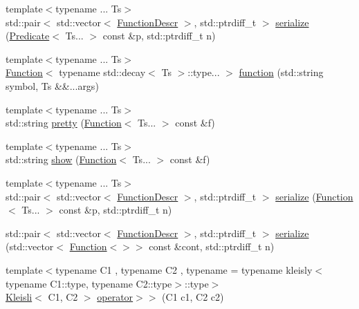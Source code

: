 \begin{DoxyCompactItemize}
\item 
{\footnotesize template$<$typename ... Ts$>$ }\\std\+::pair$<$ std\+::vector$<$ \hyperlink{structpfq_1_1lang_1_1FunctionDescr}{Function\+Descr} $>$, std\+::ptrdiff\+\_\+t $>$ \hyperlink{namespacepfq_1_1lang_ad631d8e32cf8613ad1f3f19f1b02cab6}{serialize} (\hyperlink{structpfq_1_1lang_1_1Predicate}{Predicate}$<$ Ts... $>$ const \&p, std\+::ptrdiff\+\_\+t n)
\item 
{\footnotesize template$<$typename ... Ts$>$ }\\\hyperlink{structpfq_1_1lang_1_1Function}{Function}$<$ typename std\+::decay$<$ Ts $>$\+::type... $>$ \hyperlink{namespacepfq_1_1lang_a1a4638059d700ae08d0ca63886ff2bb3}{function} (std\+::string symbol, Ts \&\&...args)
\item 
{\footnotesize template$<$typename ... Ts$>$ }\\std\+::string \hyperlink{namespacepfq_1_1lang_ae99e641e0f2d5461ed2c09ce92a82156}{pretty} (\hyperlink{structpfq_1_1lang_1_1Function}{Function}$<$ Ts... $>$ const \&f)
\item 
{\footnotesize template$<$typename ... Ts$>$ }\\std\+::string \hyperlink{namespacepfq_1_1lang_adb5a6dd5a3af8c170720c866a7839daa}{show} (\hyperlink{structpfq_1_1lang_1_1Function}{Function}$<$ Ts... $>$ const \&f)
\item 
{\footnotesize template$<$typename ... Ts$>$ }\\std\+::pair$<$ std\+::vector$<$ \hyperlink{structpfq_1_1lang_1_1FunctionDescr}{Function\+Descr} $>$, std\+::ptrdiff\+\_\+t $>$ \hyperlink{namespacepfq_1_1lang_a91564354df60bcd58020fbe47e1a7b2a}{serialize} (\hyperlink{structpfq_1_1lang_1_1Function}{Function}$<$ Ts... $>$ const \&p, std\+::ptrdiff\+\_\+t n)
\item 
std\+::pair$<$ std\+::vector$<$ \hyperlink{structpfq_1_1lang_1_1FunctionDescr}{Function\+Descr} $>$, std\+::ptrdiff\+\_\+t $>$ \hyperlink{namespacepfq_1_1lang_aa88658cb028dffc2e03a0fe2e8304bec}{serialize} (std\+::vector$<$ \hyperlink{structpfq_1_1lang_1_1Function}{Function}$<$$>$$>$ const \&cont, std\+::ptrdiff\+\_\+t n)
\item 
{\footnotesize template$<$typename C1 , typename C2 , typename  = typename kleisly$<$typename C1\+::type, typename C2\+::type$>$\+::type$>$ }\\\hyperlink{structpfq_1_1lang_1_1Kleisli}{Kleisli}$<$ C1, C2 $>$ \hyperlink{namespacepfq_1_1lang_a7572c906145bed1281a8c4ce8c8eff79}{operator$>$$>$} (C1 c1, C2 c2)

\end{DoxyCompactItemize}
